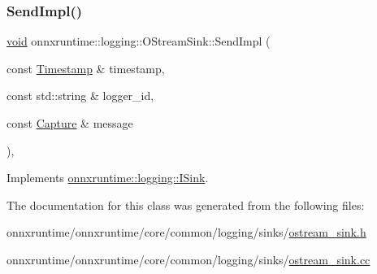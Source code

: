 \subsubsection{\texorpdfstring{Send\+Impl()}{SendImpl()}}
{\footnotesize\ttfamily \mbox{\hyperlink{mlasi_8h_a88f941d423cb2a819b70a1358982b1a6}{void}} onnxruntime\+::logging\+::\+O\+Stream\+Sink\+::\+Send\+Impl (\begin{DoxyParamCaption}\item[{const \mbox{\hyperlink{namespaceonnxruntime_1_1logging_ae7a2a84f622a028e2ad495a74289012d}{Timestamp}} \&}]{timestamp,  }\item[{const std\+::string \&}]{logger\+\_\+id,  }\item[{const \mbox{\hyperlink{classonnxruntime_1_1logging_1_1Capture}{Capture}} \&}]{message }\end{DoxyParamCaption})\hspace{0.3cm}{\ttfamily [override]}, {\ttfamily [virtual]}}



Implements \mbox{\hyperlink{classonnxruntime_1_1logging_1_1ISink}{onnxruntime\+::logging\+::\+I\+Sink}}.



The documentation for this class was generated from the following files\+:\begin{DoxyCompactItemize}
\item 
onnxruntime/onnxruntime/core/common/logging/sinks/\mbox{\hyperlink{ostream__sink_8h}{ostream\+\_\+sink.\+h}}\item 
onnxruntime/onnxruntime/core/common/logging/sinks/\mbox{\hyperlink{ostream__sink_8cc}{ostream\+\_\+sink.\+cc}}\end{DoxyCompactItemize}
